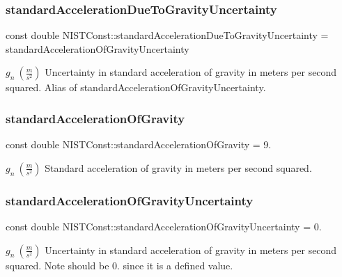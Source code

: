 \subsubsection{\texorpdfstring{standard\+Acceleration\+Due\+To\+Gravity\+Uncertainty}{standardAccelerationDueToGravityUncertainty}}
{\footnotesize\ttfamily const double N\+I\+S\+T\+Const\+::standard\+Acceleration\+Due\+To\+Gravity\+Uncertainty = standard\+Acceleration\+Of\+Gravity\+Uncertainty}

$g_n \ (\frac{m}{s^2})$ Uncertainty in standard acceleration of gravity in meters per second squared. Alias of standard\+Acceleration\+Of\+Gravity\+Uncertainty. \mbox{\label{group___gravity_acceleration_gad5bc5f7f030bc2c467a8430e00b42f5e}} 
\subsubsection{\texorpdfstring{standard\+Acceleration\+Of\+Gravity}{standardAccelerationOfGravity}}
{\footnotesize\ttfamily const double N\+I\+S\+T\+Const\+::standard\+Acceleration\+Of\+Gravity = 9.}

$g_n \ (\frac{m}{s^2})$ Standard acceleration of gravity in meters per second squared. \mbox{\label{group___gravity_acceleration_gaabc6df92c25677a5b767445f101d4f57}} 
\subsubsection{\texorpdfstring{standard\+Acceleration\+Of\+Gravity\+Uncertainty}{standardAccelerationOfGravityUncertainty}}
{\footnotesize\ttfamily const double N\+I\+S\+T\+Const\+::standard\+Acceleration\+Of\+Gravity\+Uncertainty = 0.}

$g_n \ (\frac{m}{s^2})$ Uncertainty in standard acceleration of gravity in meters per second squared. Note should be 0. since it is a defined value. 